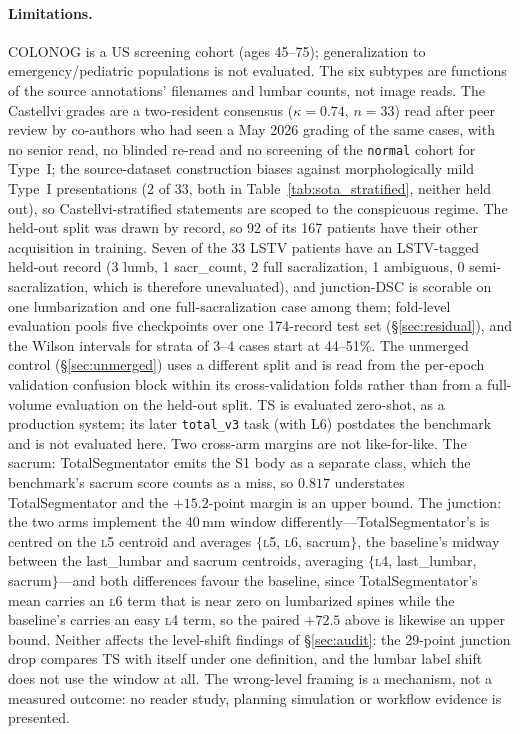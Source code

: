 \documentclass{article}
\newcommand{\TS}{TotalSegmentator}
\newcommand{\sota}{TS}
\begin{document}
\paragraph{Limitations.}
\label{sec:limits-test-set}
COLONOG is a US screening cohort (ages 45--75);
generalization to emergency/pediatric populations is not
evaluated. The six subtypes are functions of the source
annotations' filenames and lumbar counts, not image
reads. The Castellvi grades are a two-resident consensus
($\kappa{=}0.74$, $n{=}33$) read after peer review by
co-authors who had seen a May 2026 grading of the same
cases, with no senior read, no blinded re-read and no
screening of the \texttt{normal} cohort for Type~I; the
source-dataset construction biases against
morphologically mild Type~I presentations (2 of 33, both
in Table~\ref{tab:sota_stratified}, neither held out), so
Castellvi-stratified statements are scoped to the
conspicuous regime. The held-out split was drawn by
record, so 92 of its 167 patients have their other
acquisition in training. Seven of the 33 LSTV patients have an
LSTV-tagged held-out record (3 lumb, 1 sacr\_count, 2 full
sacralization, 1 ambiguous, 0 semi-sacralization, which is
therefore unevaluated), and junction-DSC is scorable on
one lumbarization and one full-sacralization case among
them; fold-level evaluation pools five checkpoints over
one 174-record test set (\S\ref{sec:residual}), and the
Wilson intervals for strata of 3--4 cases start at
44--51\%. The unmerged control (\S\ref{sec:unmerged})
uses a different split and is read from the per-epoch
validation confusion block within its cross-validation
folds rather than from a full-volume evaluation on the
held-out split. \sota{} is evaluated
zero-shot, as a production system; its later
\texttt{total\_v3} task (with L6) postdates the benchmark
and is not evaluated here. Two cross-arm margins are not
like-for-like. The sacrum: \TS{} emits the S1 body as a
separate class, which the benchmark's sacrum score counts
as a miss, so $0.817$ understates \TS{} and the
$+15.2$-point margin is an upper bound. The junction: the
two arms implement the 40\,mm window differently---\TS{}'s
is centred on the \textsc{l5} centroid and averages
$\{$\textsc{l5}, \textsc{l6}, sacrum$\}$, the baseline's
midway between the last\_lumbar and sacrum centroids,
averaging $\{$\textsc{l4}, last\_lumbar, sacrum$\}$---and
both differences favour the baseline, since \TS{}'s mean
carries an \textsc{l6} term that is near zero on
lumbarized spines while the baseline's carries an easy
\textsc{l4} term, so the paired $+72.5$ above is likewise
an upper bound. Neither affects the level-shift findings
of \S\ref{sec:audit}: the 29-point junction drop compares
\sota{} with itself under one definition, and the lumbar
label shift does not use the window at all. The
wrong-level framing is a mechanism, not a measured
outcome: no reader study, planning simulation or workflow
evidence is presented.
\end{document}
